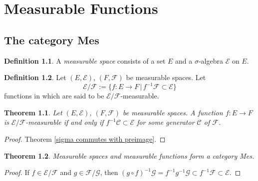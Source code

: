 \documentclass[11pt, a4paper, openany]{book}
\newtheorem{thm}{Theorem}\newtheorem{lem}{Lemma}\newtheorem{crl}{Corollary}
\theoremstyle{definition}
\newtheorem{define}{Definition}\newtheorem{exam}{Example}\newtheorem{remark}{Remark}
\DeclareMathOperator{\id}{id}
\newcommand{\cat}[1]{\textup{\textsf{#1}}}
\begin{document}
\chapter{Measurable Functions}
\section{The category Mes}
    \begin{define}
        A \textit{measurable space} consists of a set $E$ and a $\sigma$-algebra $\mathscr{E}$ on $E$.
    \end{define}
    \begin{define}
        Let $(E,\mathscr{E})$, $(F,\mathscr{F})$ be measurable spaces. Let 
        \[
            \mathscr{E}/\mathscr{F}:=\{f:E\rightarrow F\,|\,f^{-1}\mathscr{F}\subset \mathscr{E}\}
        \]
        functions in which are said to be $\mathscr{E}/\mathscr{F}$-measurable.
    \end{define}
    \begin{thm}\label{measurable functions}
        Let $(E,\mathscr{E})$, $(F,\mathscr{F})$ be measurable spaces. A function $f:E\rightarrow F$ is $\mathscr{E}/\mathscr{F}$\textit{-measurable} if and only if $f^{-1}\mathscr{C}\subset \mathscr{E}$ for some generator $\mathscr{C}$ of $\mathscr{F}$.
    \end{thm}
    \begin{proof}
        Theorem \ref{sigma commutes with preimage}. 
    \end{proof}
    \begin{thm}
        Measurable spaces and measurable functions form a category \cat{Mes}.
    \end{thm}
    \begin{proof}
        If $f\in \mathscr{E}/\mathscr{F}$ and $g\in \mathscr{F}/\mathscr{G}$, then $(g\circ f)^{-1}\mathscr{G}=f^{-1}g^{-1}\mathscr{G}\subset f^{-1}\mathscr{F}\subset \mathscr{E}$. 
    \end{proof}
\end{document}
